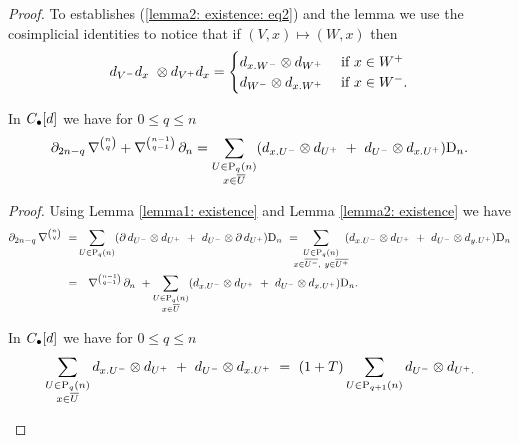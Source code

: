 \begin{proof}
	To establishes (\ref{lemma2: existence: eq2}) and the lemma we use the cosimplicial identities to notice that if $(V,x) \mapsto (W,x)$ then
	\begin{equation*}
	d_{V^-}d_x\ \otimes d_{V^+}d_x =
	\begin{cases}
	d_{x.W^-} \otimes d_{W^+} & \text{ if } x\in W^+\\
	d_{W^-} \otimes d_{x.W^+} & \text{ if } x\in W^-.
	\end{cases}
	\end{equation*}
	
	\begin{lemma} \label{lemma3: existence}
		In $C_\bullet[d]$ we have for $0 \leq q \leq n$
		\begin{equation} \label{lemma3: existence: eq1}
		\partial_{2n-q}\,\nabla^{n \choose q} + \nabla^{n-1 \choose q-1}\,\partial_n = 
		\sum_{\substack{U\in\mathrm{P}_{q}(n) \\ x\in\overline{U}}} (d_{x.U^-} \otimes d_{U^+}\ +\ d_{U^-} \otimes d_{x.U^+})\mathrm{D}_n.
		\end{equation}
	\end{lemma}
	
	\textit{Proof.}
	Using Lemma \ref{lemma1: existence} and Lemma \ref{lemma2: existence} we have
	\begin{equation*}
	\begin{split}
	\partial_{2n-q}\, \nabla^{ n \choose q}\ =& 
	\sum_{U \in \mathrm{P}_q(n)} (\partial\, d_{U^-} \otimes d_{U^+}\ +\ d_{U^-} \otimes \partial\, d_{U^+}) \mathrm{D}_n\ =\!\!\!\! 
	\sum_{\substack{U \in \mathrm{P}_q(n) \\ x \in \overline{U^-},\ y \in \overline{U^+} } }\!\! (d_{x.U^-} \otimes d_{U^+}\ +\ d_{U^-} \otimes d_{y.U^+}) \mathrm{D}_n \\ =&
	\quad \nabla^{n-1 \choose q-1}\,\partial_n\ + 
	\sum_{\substack{U\in\mathrm{P}_{q}(n) \\ x \in \overline{U}}} (d_{x.U^-} \otimes d_{U^+}\ +\ d_{U^-} \otimes d_{x.U^+}) \mathrm{D}_n.
	\end{split}				 
	\end{equation*}
	
	\begin{lemma} \label{lemma4: existence}  
		In $C_\bullet[d]$ we have for $0 \leq q \leq n$
		\begin{equation} \label{lemma4: existence: eq1}
		\sum_{\substack{U \in \mathrm{P}_{q}(n) \\ x \in \overline{U}}} d_{x.U^-} \otimes d_{U^+}\ +\ d_{U^-} \otimes d_{x.U^+}\ = \
		(1+T) \sum_{U \in \mathrm{P}_{q+1}(n)} d_{U^-} \otimes d_{U^+.}
		\end{equation}
	\end{lemma}
	

\end{proof}
